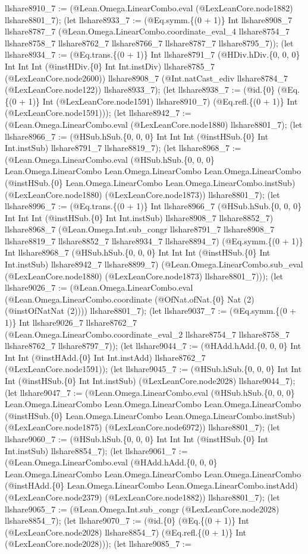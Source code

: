 \documentclass[11pt]{article}
\begin{document}
llshare8910\_7 := (@Lean.Omega.LinearCombo.eval (@LexLeanCore.node1882) llshare8801\_7); (let llshare8933\_7 := (@Eq.symm.\{(0 + 1)\} Int llshare8908\_7 llshare8787\_7 (@Lean.Omega.LinearCombo.coordinate\_eval\_4 llshare8754\_7 llshare8758\_7 llshare8762\_7 llshare8766\_7 llshare8787\_7 llshare8795\_7)); (let llshare8934\_7 := (@Eq.trans.\{(0 + 1)\} Int llshare8791\_7 (@HDiv.hDiv.\{0, 0, 0\} Int Int Int (@instHDiv.\{0\} Int Int.instDiv) llshare8785\_7 (@LexLeanCore.node2600)) llshare8908\_7 (@Int.natCast\_ediv llshare8784\_7 (@LexLeanCore.node122)) llshare8933\_7); (let llshare8938\_7 := (@id.\{0\} (@Eq.\{(0 + 1)\} Int (@LexLeanCore.node1591) llshare8910\_7) (@Eq.refl.\{(0 + 1)\} Int (@LexLeanCore.node1591))); (let llshare8942\_7 := (@Lean.Omega.LinearCombo.eval (@LexLeanCore.node1880) llshare8801\_7); (let llshare8966\_7 := (@HSub.hSub.\{0, 0, 0\} Int Int Int (@instHSub.\{0\} Int Int.instSub) llshare8791\_7 llshare8819\_7); (let llshare8968\_7 := (@Lean.Omega.LinearCombo.eval (@HSub.hSub.\{0, 0, 0\} Lean.Omega.LinearCombo Lean.Omega.LinearCombo Lean.Omega.LinearCombo (@instHSub.\{0\} Lean.Omega.LinearCombo Lean.Omega.LinearCombo.instSub) (@LexLeanCore.node1880) (@LexLeanCore.node1873)) llshare8801\_7); (let llshare8996\_7 := (@Eq.trans.\{(0 + 1)\} Int llshare8966\_7 (@HSub.hSub.\{0, 0, 0\} Int Int Int (@instHSub.\{0\} Int Int.instSub) llshare8908\_7 llshare8852\_7) llshare8968\_7 (@Lean.Omega.Int.sub\_congr llshare8791\_7 llshare8908\_7 llshare8819\_7 llshare8852\_7 llshare8934\_7 llshare8894\_7) (@Eq.symm.\{(0 + 1)\} Int llshare8968\_7 (@HSub.hSub.\{0, 0, 0\} Int Int Int (@instHSub.\{0\} Int Int.instSub) llshare8942\_7 llshare8899\_7) (@Lean.Omega.LinearCombo.sub\_eval (@LexLeanCore.node1880) (@LexLeanCore.node1873) llshare8801\_7))); (let llshare9026\_7 := (@Lean.Omega.LinearCombo.eval (@Lean.Omega.LinearCombo.coordinate (@OfNat.ofNat.\{0\} Nat (2) (@instOfNatNat (2)))) llshare8801\_7); (let llshare9037\_7 := (@Eq.symm.\{(0 + 1)\} Int llshare9026\_7 llshare8762\_7 (@Lean.Omega.LinearCombo.coordinate\_eval\_2 llshare8754\_7 llshare8758\_7 llshare8762\_7 llshare8797\_7)); (let llshare9044\_7 := (@HAdd.hAdd.\{0, 0, 0\} Int Int Int (@instHAdd.\{0\} Int Int.instAdd) llshare8762\_7 (@LexLeanCore.node1591)); (let llshare9045\_7 := (@HSub.hSub.\{0, 0, 0\} Int Int Int (@instHSub.\{0\} Int Int.instSub) (@LexLeanCore.node2028) llshare9044\_7); (let llshare9047\_7 := (@Lean.Omega.LinearCombo.eval (@HSub.hSub.\{0, 0, 0\} Lean.Omega.LinearCombo Lean.Omega.LinearCombo Lean.Omega.LinearCombo (@instHSub.\{0\} Lean.Omega.LinearCombo Lean.Omega.LinearCombo.instSub) (@LexLeanCore.node1875) (@LexLeanCore.node6972)) llshare8801\_7); (let llshare9060\_7 := (@HSub.hSub.\{0, 0, 0\} Int Int Int (@instHSub.\{0\} Int Int.instSub) llshare8854\_7); (let llshare9061\_7 := (@Lean.Omega.LinearCombo.eval (@HAdd.hAdd.\{0, 0, 0\} Lean.Omega.LinearCombo Lean.Omega.LinearCombo Lean.Omega.LinearCombo (@instHAdd.\{0\} Lean.Omega.LinearCombo Lean.Omega.LinearCombo.instAdd) (@LexLeanCore.node2379) (@LexLeanCore.node1882)) llshare8801\_7); (let llshare9065\_7 := (@Lean.Omega.Int.sub\_congr (@LexLeanCore.node2028) llshare8854\_7); (let llshare9070\_7 := (@id.\{0\} (@Eq.\{(0 + 1)\} Int (@LexLeanCore.node2028) llshare8854\_7) (@Eq.refl.\{(0 + 1)\} Int (@LexLeanCore.node2028))); (let llshare9085\_7 := 
\end{document}
